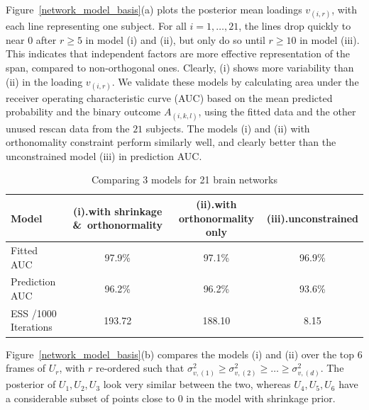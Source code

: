 \documentclass[10pt,fleqn]{article}
\DeclareMathOperator{\1}{\mathbbm{1}}
\begin{document}
Figure~\ref{network_model_basis}(a)
plots the posterior mean loadings $v_{(i,r)
}$, with each line representing one subject. For all $i=1,\ldots,21$, the
lines drop quickly to near $0$ after $r\ge 5$ in  model (i)
and (ii), but only do so
until $r\ge 10$ in model (iii). This indicates that independent factors are more effective  representation of the span, compared to non-orthogonal ones. Clearly,
(i) shows more variability than (ii) in the loading $v_{(i,r)}$. We validate these models by calculating area under the receiver operating characteristic curve  (AUC) based on the mean predicted probability and the binary outcome $A_{(i,k,l)}$, using the fitted data and the other unused rescan data from the $21$ subjects.
The models (i) and (ii) with orthonomality constraint perform similarly well, and clearly better than 
the unconstrained model (iii) in prediction AUC.  
 \begin{table}[H]
   \begin{center}
   \tiny
   \begin{tabular}{ l| c | c| c }
   \hline     
 Model   &  (i).with shrinkage \&\ orthonormality    & (ii).with  orthonormality only  & (iii).unconstrained \\         
       \hline           
     Fitted AUC &  97.9\%  & 97.1\%  & 96.9\%     \\
   \hline
     Prediction AUC & 96.2\% & 96.2\%  & 93.6\%      \\
   \hline
   ESS /1000 Iterations &  193.72  & 188.10  & 8.15     \\
   \hline  
   \end{tabular}
   \end{center}
   \caption{Comparing 3 models for 21 brain networks
   \label{network_model}}
   \end{table}

Figure~\ref{network_model_basis}(b) compares the models (i) and (ii) over the top $6$ frames of $U_r$, with  $r$
 re-ordered such that $\sigma^2_{v,(1)}\ge \sigma^2_{v,(2)}\ge \ldots \ge \sigma^2_{v,(d)}$. The posterior of $U_1,U_2,U_3$ look very similar between the two, whereas $U_4,U_5,U_6$ have a considerable subset
of points close to 0 in the model with shrinkage prior.
\end{document}
